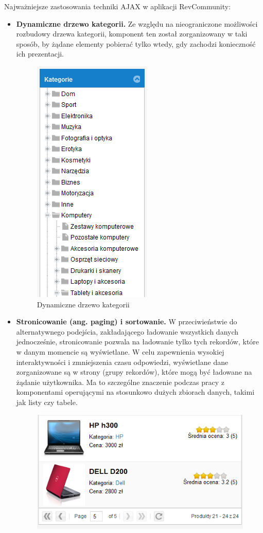 Najważniejsze zastosowania techniki AJAX w aplikacji RevCommunity:
\begin{itemize}
\item\textbf{Dynamiczne drzewo kategorii.} Ze względu na nieograniczone możliwości rozbudowy drzewa kategorii, komponent ten został zorganizowany w taki sposób, by żądane elementy pobierać tylko wtedy, gdy zachodzi konieczność ich prezentacji.
\begin{figure}[H]
	\centering
	\includegraphics[scale=0.7]{images/Kategorie.png}
	\caption{Dynamiczne drzewo kategorii}
\end{figure}
\item\textbf{Stronicowanie (ang. paging) i sortowanie.} W przeciwieństwie do alternatywnego podejścia, zakładającego ładowanie wszystkich danych jednocześnie, stronicowanie pozwala na ładowanie tylko tych rekordów, które w danym momencie są wyświetlane. W celu zapewnienia wysokiej interaktywności i zmniejszenia czasu odpowiedzi, wyświetlane dane zorganizowane są w strony (grupy rekordów), które mogą być ładowane na żądanie użytkownika. Ma to szczególne znaczenie podczas pracy z komponentami operującymi na stosunkowo dużych zbiorach danych, takimi jak listy czy tabele.
\begin{figure}[H]
	\centering
	\includegraphics[scale=0.7]{images/paging.png}

\end{figure}
\end{itemize}
